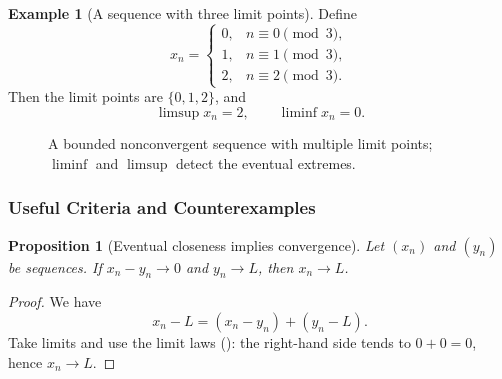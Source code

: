 \documentclass[12pt]{article}
\numberwithin{equation}{section}
\newcommand{\casesm}[1]{\begin{cases}#1\end{cases}}
\theoremstyle{plain}
\newtheorem{proposition}[theorem]{Proposition}
\theoremstyle{definition}
\newtheorem{example}[theorem]{Example}
\theoremstyle{remark}
\begin{document}
\begin{example}[A sequence with three limit points]
Define
\[
x_n =
\casesm{
0, & n\equiv 0 \pmod 3,\\
1, & n\equiv 1 \pmod 3,\\
2, & n\equiv 2 \pmod 3.
}
\]
Then the limit points are $\{0,1,2\}$, and
\[
\limsup x_n = 2,
\qquad
\liminf x_n = 0.
\]
\end{example}

\begin{figure}[H]
\centering
{}
\caption{A bounded nonconvergent sequence with multiple limit points; $\liminf$ and $\limsup$ detect the eventual extremes.}
\end{figure}

\subsubsection{Useful Criteria and Counterexamples}

\begin{proposition}[Eventual closeness implies convergence]\label{prop:eventual-close}
Let $(x_n)$ and $(y_n)$ be sequences. If $x_n-y_n\to 0$ and $y_n\to L$, then $x_n\to L$.
\end{proposition}

\begin{proof}
We have
\[
x_n-L = (x_n-y_n) + (y_n-L).
\]
Take limits and use the limit laws (): the right-hand side tends to $0+0=0$, hence $x_n\to L$.
\end{proof}
\end{document}
